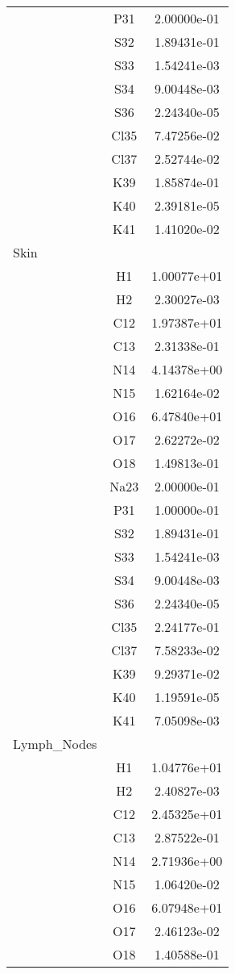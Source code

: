\begin{centering}
\begin{longtable}{l c c}
& P31 & 2.00000e-01 \\ 
& S32 & 1.89431e-01 \\ 
& S33 & 1.54241e-03 \\ 
& S34 & 9.00448e-03 \\ 
& S36 & 2.24340e-05 \\ 
& Cl35 & 7.47256e-02 \\ 
& Cl37 & 2.52744e-02 \\ 
& K39 & 1.85874e-01 \\ 
& K40 & 2.39181e-05 \\ 
& K41 & 1.41020e-02 \\ 
\hline
Skin & & \\
\hline
& H1 & 1.00077e+01 \\ 
& H2 & 2.30027e-03 \\ 
& C12 & 1.97387e+01 \\ 
& C13 & 2.31338e-01 \\ 
& N14 & 4.14378e+00 \\ 
& N15 & 1.62164e-02 \\ 
& O16 & 6.47840e+01 \\ 
& O17 & 2.62272e-02 \\ 
& O18 & 1.49813e-01 \\ 
& Na23 & 2.00000e-01 \\ 
& P31 & 1.00000e-01 \\ 
& S32 & 1.89431e-01 \\ 
& S33 & 1.54241e-03 \\ 
& S34 & 9.00448e-03 \\ 
& S36 & 2.24340e-05 \\ 
& Cl35 & 2.24177e-01 \\ 
& Cl37 & 7.58233e-02 \\ 
& K39 & 9.29371e-02 \\ 
& K40 & 1.19591e-05 \\ 
& K41 & 7.05098e-03 \\ 
\hline
Lymph\_Nodes & & \\
\hline
& H1 & 1.04776e+01 \\ 
& H2 & 2.40827e-03 \\ 
& C12 & 2.45325e+01 \\ 
& C13 & 2.87522e-01 \\ 
& N14 & 2.71936e+00 \\ 
& N15 & 1.06420e-02 \\ 
& O16 & 6.07948e+01 \\ 
& O17 & 2.46123e-02 \\ 
& O18 & 1.40588e-01 \\ 

\end{longtable}
\end{centering}
